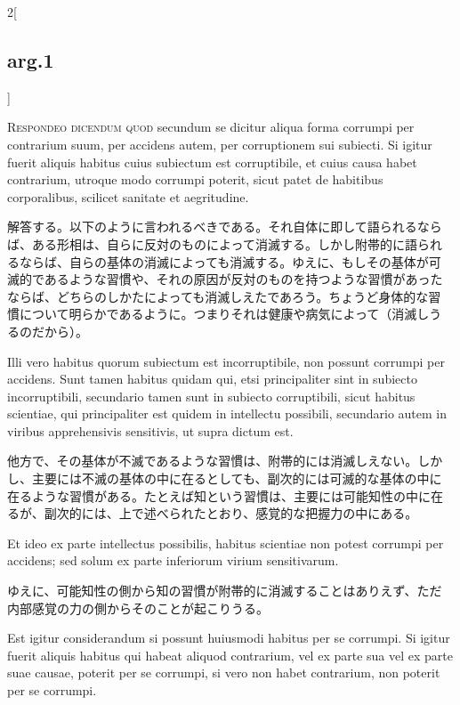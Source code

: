\documentclass[paper=a4paper,fontsize=10pt,jafontsize=9pt,titlepage]{jlreq}
\begin{document}
\begin{paracol}{2}[\subsection{arg.1}]

{\scshape Respondeo dicendum quod} secundum se dicitur aliqua forma
corrumpi per contrarium suum, per accidens autem, per corruptionem sui
subiecti. Si igitur fuerit aliquis habitus cuius subiectum est
corruptibile, et cuius causa habet contrarium, utroque modo corrumpi
poterit, sicut patet de habitibus corporalibus, scilicet sanitate et
aegritudine.

\switchcolumn

解答する。以下のように言われるべきである。それ自体に即して語られるなら
ば、ある形相は、自らに反対のものによって消滅する。しかし附帯的に語られ
るならば、自らの基体の消滅によっても消滅する。ゆえに、もしその基体が可
滅的であるような習慣や、それの原因が反対のものを持つような習慣があった
ならば、どちらのしかたによっても消滅しえたであろう。ちょうど身体的な習
慣について明らかであるように。つまりそれは健康や病気によって（消滅しう
るのだから）。

\switchcolumn*

Illi vero habitus quorum subiectum est incorruptibile, non possunt
corrumpi per accidens. Sunt tamen habitus quidam qui, etsi
principaliter sint in subiecto incorruptibili, secundario tamen sunt
in subiecto corruptibili, sicut habitus scientiae, qui principaliter
est quidem in intellectu possibili, secundario autem in viribus
apprehensivis sensitivis, ut supra dictum est.

\switchcolumn

他方で、その基体が不滅であるような習慣は、附帯的には消滅しえない。しか
し、主要には不滅の基体の中に在るとしても、副次的には可滅的な基体の中に
在るような習慣がある。たとえば知という習慣は、主要には可能知性の中に在
るが、副次的には、上で述べられたとおり、感覚的な把握力の中にある。

\switchcolumn*

Et ideo ex parte intellectus possibilis, habitus scientiae non potest
corrumpi per accidens; sed solum ex parte inferiorum virium
sensitivarum.

\switchcolumn

ゆえに、可能知性の側から知の習慣が附帯的に消滅することはありえず、ただ
内部感覚の力の側からそのことが起こりうる。

\switchcolumn*

Est igitur considerandum si possunt huiusmodi habitus per se
corrumpi. Si igitur fuerit aliquis habitus qui habeat aliquod
contrarium, vel ex parte sua vel ex parte suae causae, poterit per se
corrumpi, si vero non habet contrarium, non poterit per se corrumpi.


\end{paracol}
\end{document}
